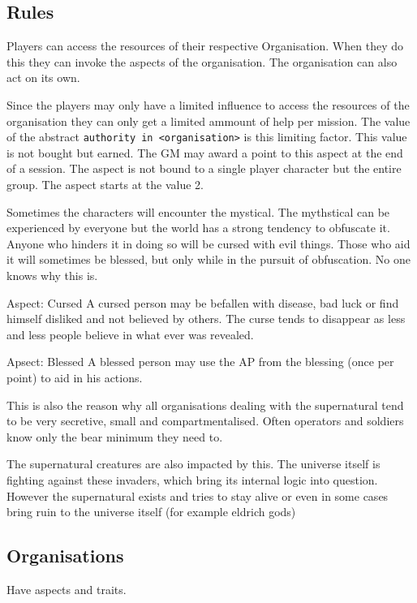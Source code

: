 \documentclass[11pt]{article}
\begin{document}
{\subsection{Rules}
\label{sec:org1f94522}

Players can access the resources of their respective Organisation. When they do this they can invoke the aspects of the organisation. The organisation can also act on its own.

Since the players may only have a limited influence to access the resources of the organisation they can only get a limited ammount of help per mission. The value of the abstract \texttt{authority in <organisation>}  is this limiting factor. This value is not bought but earned. The GM may award a point to this aspect at the end of a session. The aspect is not bound to a single player character but the entire group. The aspect starts at the value 2. 



Sometimes the characters will encounter the mystical. The mythstical can be experienced by everyone but the world has a strong tendency to obfuscate it. Anyone who hinders it in doing so will be cursed with evil things. Those who aid it will sometimes be blessed, but only while in the pursuit of obfuscation. No one knows why this is.

Aspect: Cursed
A cursed person may be befallen with disease, bad luck or find himself disliked and not believed by others. The curse tends to disappear as less and less people believe in what ever was revealed.

Apsect: Blessed
A blessed person may use the AP from the blessing (once per point) to aid in his actions. 

This is also the reason why all organisations dealing with the supernatural tend to be very secretive, small and compartmentalised. Often operators and soldiers know only the bear minimum they need to. 

The supernatural creatures are also impacted by this. The universe itself is fighting against these invaders, which bring its internal logic into question. However the supernatural exists and tries to stay alive or even in some cases bring ruin to the universe itself (for example eldrich gods)

\subsection{Organisations}
\label{sec:org7a90529}
Have aspects and traits.

}
\end{document}
